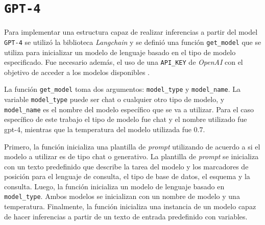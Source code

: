 \section{\texttt{GPT-4}}

Para implementar una estructura capaz de realizar inferencias a partir del model \texttt{GPT-4} se utilizó la biblioteca \textit{Langchain} y se definió una función \texttt{get\_model} que se utiliza para inicializar un modelo de lenguaje basado en el tipo de modelo especificado. Fue necesario además, el uso de una \texttt{API\_KEY} de \textit{OpenAI} con el objetivo de acceder a los modelos disponibles \cite{openaiapikey}.

La función \texttt{get\_model} toma dos argumentos: \texttt{model\_type} y \texttt{model\_name}. La variable \texttt{model\_type} puede ser chat o cualquier otro tipo de modelo, y \texttt{model\_name} es el nombre del modelo específico que se va a utilizar. Para el caso específico de este trabajo el tipo de modelo fue chat y el nombre utilizado fue gpt-4, mientras que la temperatura del modelo utilizada fue $0.7$.

Primero, la función inicializa una plantilla de \textit{prompt} utilizando de acuerdo a si el modelo a utilizar es de tipo chat o generativo. La plantilla de \textit{prompt} se inicializa con un texto predefinido que describe la tarea del modelo y los marcadores de posición para el lenguaje de consulta, el tipo de base de datos, el esquema y la consulta. Luego, la función inicializa un modelo de lenguaje basado en \texttt{model\_type}. Ambos modelos se inicializan con un nombre de modelo y una temperatura. Finalmente, la función inicializa una instancia de un modelo capaz de hacer inferencias a partir de un texto de entrada predefinido con variables.

